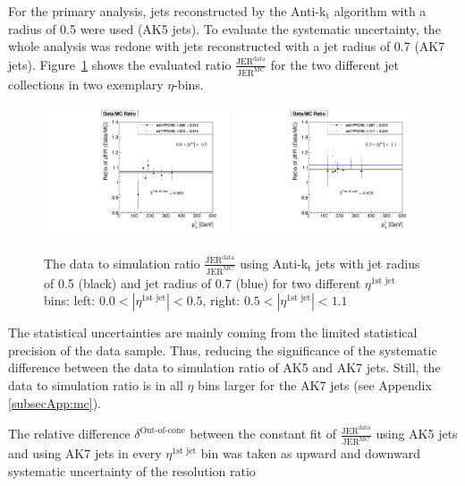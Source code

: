 For the primary analysis, jets reconstructed by the Anti-k$_{\text{t}}$ algorithm with a radius of 0.5 were used (AK5 jets). 
To evaluate the systematic uncertainty, the whole analysis was redone with jets reconstructed with a jet radius of 0.7 (AK7 jets). 
\mbox{Figure \ref{fig:ak5ak7}} shows the evaluated ratio $\frac{\text{JER}^{\text{data}}}{\text{JER}^{\text{MC}}}$  
for the two different jet collections in two  exemplary $\eta$-bins. 
\begin{figure}[b]
 \centering
     \includegraphics[width=0.49\textwidth]{figures/resolution/systematicUncertainties/Ratio_Resolution_for_1_eta_bin_PFCHS_RMS99_ak5_ak7_comparison.pdf}
    \includegraphics[width=0.49\textwidth]{figures/resolution/systematicUncertainties/Ratio_Resolution_for_2_eta_bin_PFCHS_RMS99_ak5_ak7_comparison.pdf}
  \caption{The data to simulation ratio $\frac{\text{JER}^{\text{data}}}{\text{JER}^{\text{MC}}}$ 
           using Anti-k$_{\text{t}}$ jets with jet radius of 0.5 (black) and jet radius of 0.7 (blue) for two different $\eta^{\text{1st jet}}$ bins: 
           left:  $0.0<|\eta^{\text{1st jet}}|<0.5$, right: $0.5<|\eta^{\text{1st jet}}|<1.1$}
 \label{fig:ak5ak7}
\end{figure}
The statistical uncertainties are mainly coming from the limited statistical precision of the data sample. 
Thus, reducing the significance of the systematic difference between the data to simulation ratio of  AK5 and AK7 jets.
Still, the data to simulation ratio is in all $\eta$ bins larger for the AK7 jets (see Appendix \ref{subsecApp:mc}).

The relative difference $\delta^{\text{Out-of-cone}}$ between the constant fit of $\frac{\text{JER}^{\text{data}}}{\text{JER}^{\text{MC}}}$ using AK5 jets and using 
AK7 jets in every $\eta^{\text{1st jet}}$ bin was taken as upward and downward systematic uncertainty of the resolution ratio

